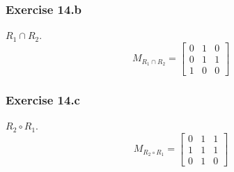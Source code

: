 \documentclass[12pt]{article}
\begin{document}
    \subsubsection{Exercise 14.b}
    $ R_1 \cap R_2 $.
    \begin{equation}
        M_{ R_1 \cap R_2}=
        \begin{bmatrix}
            0 & 1 & 0\\
            0 & 1 & 1\\
            1 & 0 & 0
        \end{bmatrix}
    \end{equation}
    
    \subsubsection{Exercise 14.c}
    $ R_2 \circ R_1$.
    \begin{equation}
       M_{R_2 \circ R_1}=
        \begin{bmatrix}
        0&1&1\\
        1&1&1\\
        0&1&0
        \end{bmatrix}
    \end{equation}
\end{document}
